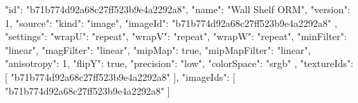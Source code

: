 {
  "id": "b71b774d92a68c27ff523b9e4a2292a8",
  "name": "Wall Shelf ORM",
  "version": 1,
  "source": {
    "kind": "image",
    "imageId": "b71b774d92a68c27ff523b9e4a2292a8"
  },
  "settings": {
    "wrapU": "repeat",
    "wrapV": "repeat",
    "wrapW": "repeat",
    "minFilter": "linear",
    "magFilter": "linear",
    "mipMap": true,
    "mipMapFilter": "linear",
    "anisotropy": 1,
    "flipY": true,
    "precision": "low",
    "colorSpace": "srgb"
  },
  "textureIds": [
    "b71b774d92a68c27ff523b9e4a2292a8"
  ],
  "imageIds": [
    "b71b774d92a68c27ff523b9e4a2292a8"
  ]
}
